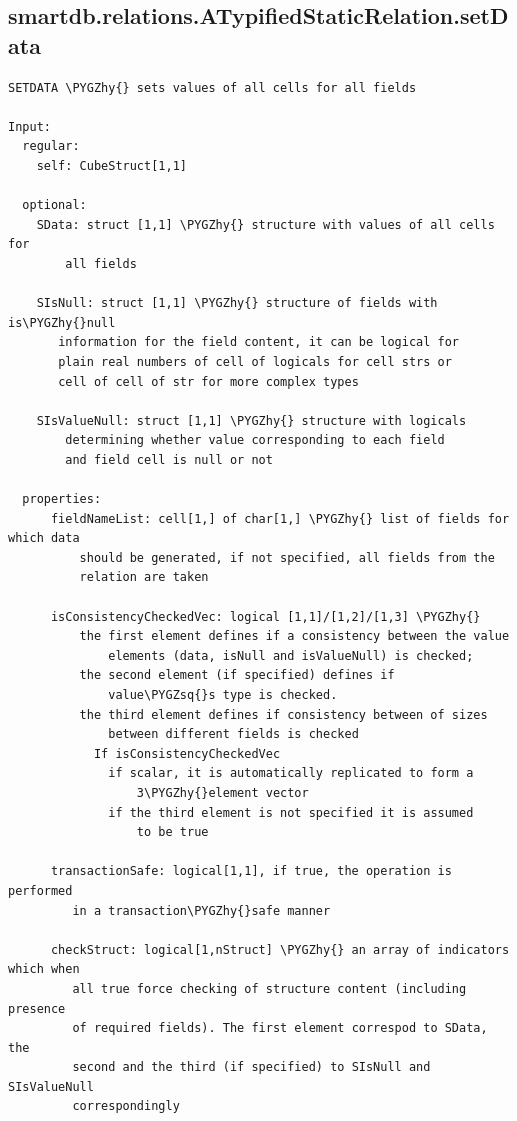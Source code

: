 \documentclass[letterpaper,10pt,english]{sphinxmanual}
\def\PYGZhy{\char`\-}
\def\PYGZsq{\char`\'}
\begin{document}
\subsection{smartdb.relations.ATypifiedStaticRelation.setData}
\label{chap_functions:smartdb-relations-atypifiedstaticrelation-setdata}
\begin{Verbatim}[commandchars=\\\{\}]
SETDATA \PYGZhy{} sets values of all cells for all fields

Input:
  regular:
    self: CubeStruct[1,1]

  optional:
    SData: struct [1,1] \PYGZhy{} structure with values of all cells for
        all fields

    SIsNull: struct [1,1] \PYGZhy{} structure of fields with is\PYGZhy{}null
       information for the field content, it can be logical for
       plain real numbers of cell of logicals for cell strs or
       cell of cell of str for more complex types

    SIsValueNull: struct [1,1] \PYGZhy{} structure with logicals
        determining whether value corresponding to each field
        and field cell is null or not

  properties:
      fieldNameList: cell[1,] of char[1,] \PYGZhy{} list of fields for which data
          should be generated, if not specified, all fields from the
          relation are taken

      isConsistencyCheckedVec: logical [1,1]/[1,2]/[1,3] \PYGZhy{}
          the first element defines if a consistency between the value
              elements (data, isNull and isValueNull) is checked;
          the second element (if specified) defines if
              value\PYGZsq{}s type is checked.
          the third element defines if consistency between of sizes
              between different fields is checked
            If isConsistencyCheckedVec
              if scalar, it is automatically replicated to form a
                  3\PYGZhy{}element vector
              if the third element is not specified it is assumed
                  to be true

      transactionSafe: logical[1,1], if true, the operation is performed
         in a transaction\PYGZhy{}safe manner

      checkStruct: logical[1,nStruct] \PYGZhy{} an array of indicators which when
         all true force checking of structure content (including presence
         of required fields). The first element correspod to SData, the
         second and the third (if specified) to SIsNull and SIsValueNull
         correspondingly


\end{Verbatim}
\end{document}
